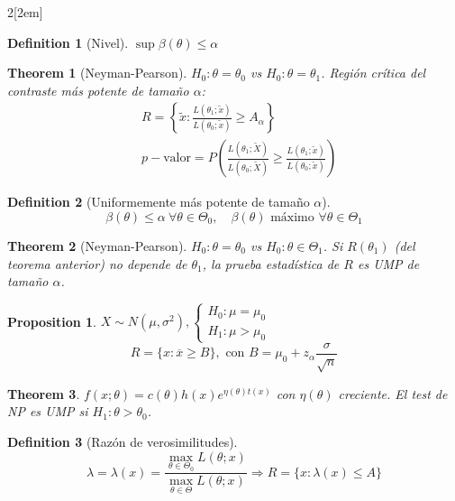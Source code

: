 \documentclass[leqno]{article}
\newtheorem*{theorem}{Theorem}
\newtheorem*{proposition}{Proposition}
\newtheorem*{definition}{Definition}
\begin{document}
\begin{multicols}{2}[\columnsep2em]
\begin{definition}[Nivel] $\sup \beta (\theta )\le \alpha $
\end{definition}

\begin{theorem}[Neyman-Pearson] $H_0: \theta = \theta_0$ vs $H_0: \theta = \theta_1$. Región crítica del contraste más potente de tamaño $\alpha$:
\begin{align*}
  & R = \left\{ \tilde{x} : \frac{L(\theta _1;\tilde{x})}{L(\theta _0;\tilde{x})}\ge A_\alpha  \right\}\\
  & p-\text{valor} = P\left( \frac{L(\theta _1;\tilde{X})}{L(\theta _0; \tilde{X})}\ge \frac{L(\theta _1;\tilde{x})}{L(\theta _0;\tilde{x})} \right) 
\end{align*}

\end{theorem}

\begin{definition}[Uniformemente más potente de tamaño $\alpha$]
\[\beta (\theta ) \leq \alpha \ \forall \theta \in \Theta_0, \quad \beta (\theta ) \text{ máximo } \forall \theta \in \Theta_1\]
\end{definition}

\begin{theorem}[Neyman-Pearson] $H_0: \theta = \theta_0$ vs $H_0: \theta \in \Theta_1$. Si $R(\theta_1)$ (del teorema anterior) no depende de $\theta_1$, la prueba estadística de $R$ es UMP de tamaño $\alpha$.
\end{theorem}

\begin{proposition}
$X \sim N(\mu, \sigma ^2), \begin{cases}
  H_0: \mu=\mu_0\\
  H_1:\mu>\mu_0
\end{cases}$ 
\[
  R = \{x: \overline{x}\ge B\}, \text{ con } B = \mu_0+z_\alpha \frac{\sigma}{\sqrt{n}}
\] 
\end{proposition}

\begin{theorem} $f(x;\theta ) = c(\theta )h(x)e^{\eta(\theta )t(x)}$ con $\eta(\theta )$ creciente.
El test de NP es UMP si $H_1: \theta > \theta_0$.
\end{theorem}

\begin{definition}[Razón de verosimilitudes]
\[
  \lambda = \lambda(x) = \frac{\max_{\theta \in \Theta _0 }L(\theta ;x)}{\max_{\theta \in \Theta}L(\theta ;x)} \Rightarrow R = \{x:\lambda(x)\le A\}
\] 
\end{definition}


\end{multicols}
\end{document}
